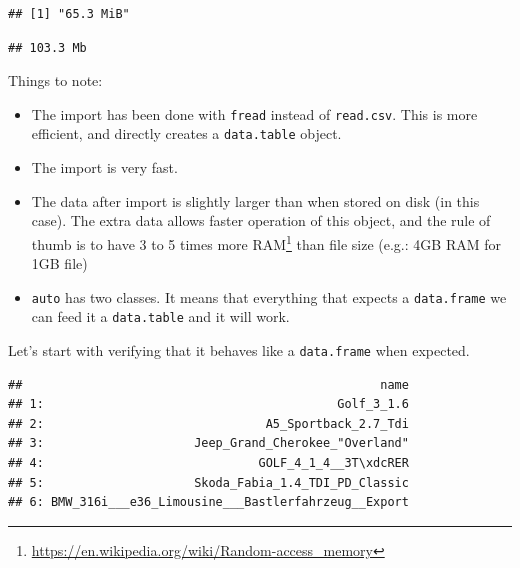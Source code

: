 \documentclass[]{book}
\newenvironment{Shaded}{\begin{snugshade}}{\end{snugshade}}
\newcommand{\CommentTok}[1]{\textcolor[rgb]{0.56,0.35,0.01}{\textit{#1}}}
\newcommand{\DataTypeTok}[1]{\textcolor[rgb]{0.13,0.29,0.53}{#1}}
\newcommand{\DecValTok}[1]{\textcolor[rgb]{0.00,0.00,0.81}{#1}}
\newcommand{\KeywordTok}[1]{\textcolor[rgb]{0.13,0.29,0.53}{\textbf{#1}}}
\newcommand{\NormalTok}[1]{#1}
\newcommand{\OperatorTok}[1]{\textcolor[rgb]{0.81,0.36,0.00}{\textbf{#1}}}
\newcommand{\StringTok}[1]{\textcolor[rgb]{0.31,0.60,0.02}{#1}}
\providecommand{\tightlist}{%
  \setlength{\itemsep}{0pt}\setlength{\parskip}{0pt}}
\renewcommand{\href}[2]{#2\footnote{\url{#1}}}
\theoremstyle{definition}
\theoremstyle{definition}
\theoremstyle{definition}
\theoremstyle{remark}
\begin{document}
\begin{verbatim}
## [1] "65.3 MiB"
\end{verbatim}

\begin{Shaded}
\end{Shaded}

\begin{verbatim}
## 103.3 Mb
\end{verbatim}

Things to note:

\begin{itemize}
\tightlist
\item
  The import has been done with \texttt{fread} instead of \texttt{read.csv}. This is more efficient, and directly creates a \texttt{data.table} object.
\item
  The import is very fast.
\item
  The data after import is slightly larger than when stored on disk (in this case). The extra data allows faster operation of this object, and the rule of thumb is to have 3 to 5 times more \href{https://en.wikipedia.org/wiki/Random-access_memory}{RAM} than file size (e.g.: 4GB RAM for 1GB file)
\item
  \texttt{auto} has two classes. It means that everything that expects a \texttt{data.frame} we can feed it a \texttt{data.table} and it will work.
\end{itemize}

Let's start with verifying that it behaves like a \texttt{data.frame} when expected.

\begin{Shaded}
\end{Shaded}

\begin{verbatim}
##                                                  name
## 1:                                         Golf_3_1.6
## 2:                               A5_Sportback_2.7_Tdi
## 3:                     Jeep_Grand_Cherokee_"Overland"
## 4:                              GOLF_4_1_4__3T\xdcRER
## 5:                     Skoda_Fabia_1.4_TDI_PD_Classic
## 6: BMW_316i___e36_Limousine___Bastlerfahrzeug__Export
\end{verbatim}
\end{document}
